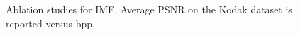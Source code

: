 \begin{figure}[t]
\begin{subfigure}{.45\textwidth}
		\label{fig: iteration ablation psnr-vs-bpp}
	\end{subfigure}%
	\caption{Ablation studies for IMF. Average PSNR on the Kodak dataset is reported versus bpp. 
    }
	\label{fig: ablation studies}
\end{figure}



